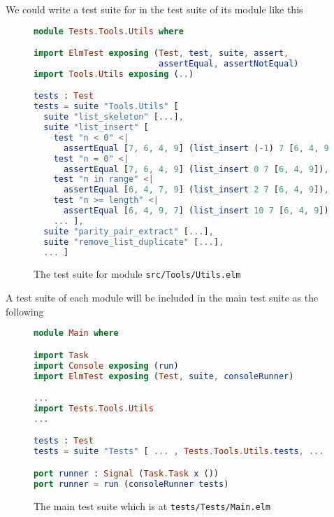 \documentclass[master.tex]{subfiles}
\begin{document}
We could write a test suite for  in the test suite of its module like this

\begin{figure}[H]
\begin{framed}
\begin{lstlisting}[language=elm]
module Tests.Tools.Utils where

import ElmTest exposing (Test, test, suite, assert,
                         assertEqual, assertNotEqual)
import Tools.Utils exposing (..)

tests : Test
tests = suite "Tools.Utils" [
  suite "list_skeleton" [...],
  suite "list_insert" [
    test "n < 0" <|
      assertEqual [7, 6, 4, 9] (list_insert (-1) 7 [6, 4, 9]),
    test "n = 0" <|
      assertEqual [7, 6, 4, 9] (list_insert 0 7 [6, 4, 9]),
    test "n in range" <|
      assertEqual [6, 4, 7, 9] (list_insert 2 7 [6, 4, 9]),
    test "n >= length" <|
      assertEqual [6, 4, 9, 7] (list_insert 10 7 [6, 4, 9]),
    ... ],
  suite "parity_pair_extract" [...],
  suite "remove_list_duplicate" [...],
  ... ]
\end{lstlisting}
\end{framed}
\caption{The test suite for module \texttt{src/Tools/Utils.elm}}
\label{fig:implementation-test-test}
\end{figure}

A test suite of each module will be included in the main test suite as the
following

\begin{figure}[H]
\begin{framed}
\begin{lstlisting}[language=elm]
module Main where

import Task
import Console exposing (run)
import ElmTest exposing (Test, suite, consoleRunner)

...
import Tests.Tools.Utils
...

tests : Test
tests = suite "Tests" [ ... , Tests.Tools.Utils.tests, ... ]

port runner : Signal (Task.Task x ())
port runner = run (consoleRunner tests)
\end{lstlisting}
\end{framed}
\caption{The main test suite which is at \texttt{tests/Tests/Main.elm}}
\label{fig:implementation-test-main}
\end{figure}
\end{document}
